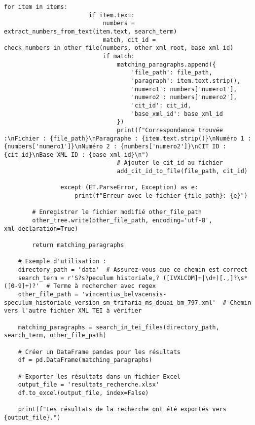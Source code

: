 \begin{lstlisting}[breaklines=true]
					for item in items:
						if item.text:
							numbers = extract_numbers_from_text(item.text, search_term) 
							match, cit_id = check_numbers_in_other_file(numbers, other_xml_root, base_xml_id)
							if match:
								matching_paragraphs.append({
									'file_path': file_path, 
									'paragraph': item.text.strip(),
									'numero1': numbers['numero1'],
									'numero2': numbers['numero2'],
									'cit_id': cit_id,
									'base_xml_id': base_xml_id
								})
								print(f"Correspondance trouvée :\nFichier : {file_path}\nParagraphe : {item.text.strip()}\nNuméro 1 : {numbers['numero1']}\nNuméro 2 : {numbers['numero2']}\nCIT ID : {cit_id}\nBase XML ID : {base_xml_id}\n")
								# Ajouter le cit_id au fichier
								add_cit_id_to_file(file_path, cit_id)
	
				except (ET.ParseError, Exception) as e:
					print(f"Erreur avec le fichier {file_path}: {e}")
	
		# Enregistrer le fichier modifié other_file_path
		other_tree.write(other_file_path, encoding='utf-8', xml_declaration=True)
	
		return matching_paragraphs
	
	# Exemple d'utilisation :
	directory_path = 'data'  # Assurez-vous que ce chemin est correct
	search_term = r'S?s?peculum historiale,? ([IVXLCDM]+|\d+)[.,]?\s*([0-9]+)?'  # Terme à rechercher avec regex
	other_file_path = 'vincentius_belvacensis-speculum_historiale_version_sm_trifaria_ms_douai_bm_797.xml'  # Chemin vers l'autre fichier XML TEI à vérifier
	
	matching_paragraphs = search_in_tei_files(directory_path, search_term, other_file_path)
	
	# Créer un DataFrame pandas pour les résultats
	df = pd.DataFrame(matching_paragraphs)
	
	# Exporter les résultats dans un fichier Excel
	output_file = 'resultats_recherche.xlsx'
	df.to_excel(output_file, index=False)
	
	print(f"Les résultats de la recherche ont été exportés vers {output_file}.")
	
\end{lstlisting}